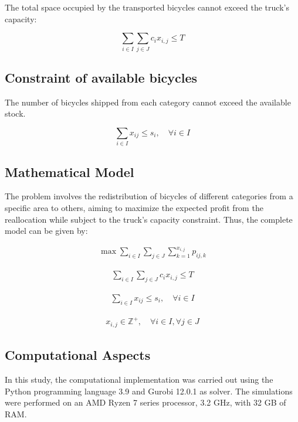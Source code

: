 \documentclass[]{article}
\begin{document}
The total space occupied by the transported bicycles cannot exceed the truck's capacity:

\begin{equation}
\sum_{i \in I} \sum_{j \in J} c_i x_{i,j} \leq T
\end{equation}

\subsection{Constraint of available bicycles}

The number of bicycles shipped from each category cannot exceed the available stock.

\begin{equation}
\sum_{i \in I} x_{ij} \leq s_i, \quad \forall i \in I
\end{equation}

\subsection{Mathematical Model}

The problem involves the redistribution of bicycles of different categories from a specific area to others, aiming to maximize the expected profit from the reallocation while subject to the truck's capacity constraint. Thus, the complete model can be given by:

	
\begin{align}
\max \sum_{i \in I} \sum_{j \in J} \sum_{k=1}^{x_{i,j}} p_{ij,k}
\end{align}

\begin{align}
\sum_{i \in I} \sum_{j \in J} c_i x_{i,j} \leq T
\end{align}

\begin{align}
\sum_{i \in I} x_{ij} \leq s_i, \quad \forall i \in I
\end{align}

\begin{align}
		x_{i,j} \in \mathbb{Z}^+,  \quad \forall i \in I, \forall j \in J
\end{align}
	


\subsection{Computational Aspects}

In this study, the computational implementation was carried out using the Python programming language 3.9 and Gurobi 12.0.1 as solver. The simulations were performed on an AMD Ryzen 7 series processor, 3.2 GHz, with 32 GB of RAM.
\end{document}
